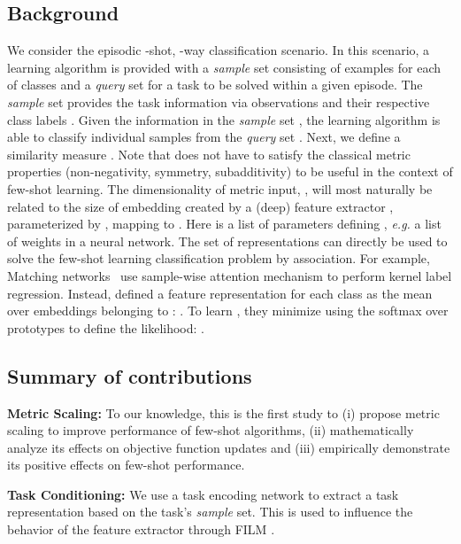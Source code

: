 \documentclass{article}
\begin{document}
\subsection{Background} \label{ssec:definitions}

We consider the episodic -shot, -way classification scenario. In this scenario, a learning algorithm is provided with a \emph{sample} set  consisting of  examples for each of  classes and a \emph{query} set  for a task to be solved within a given episode. The \emph{sample} set provides the task information via observations  and their respective class labels . Given the information in the \emph{sample} set , the learning algorithm is able to classify individual samples from the \emph{query} set . Next, we define a similarity measure . Note that  does not have to satisfy the classical metric properties (non-negativity, symmetry, subadditivity) to be useful in the context of few-shot learning. The dimensionality of metric input, , will most naturally be related to the size of embedding created by a (deep) feature extractor , parameterized by , mapping  to . Here  is a list of parameters defining , \emph{e.g.} a list of weights in a neural network. The set of representations  can directly be used to solve the few-shot learning classification problem by association. For example, Matching networks~\citep{vinyals2016matching} use sample-wise attention mechanism to perform kernel label regression. Instead, \citet{snell2017prototypical} defined a feature representation  for each class  as the mean over embeddings belonging to : . To learn , they minimize  using the softmax over prototypes  to define the likelihood: .


\subsection{Summary of contributions} \label{ssec:summary_of_contributions}

\textbf{Metric Scaling:} To our knowledge, this is the first study to (i) propose metric scaling to improve performance of few-shot algorithms, (ii) mathematically analyze its effects on objective function updates and (iii) empirically demonstrate its positive effects on few-shot performance.

\textbf{Task Conditioning:} We use a task encoding network to extract a task representation based on the task's \emph{sample} set. This is used to influence the behavior of the feature extractor through FILM \citep{perez2017film}.
\end{document}
